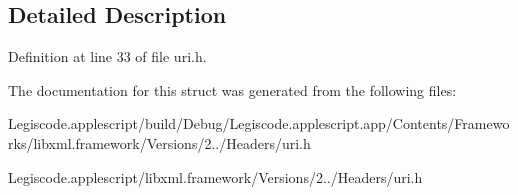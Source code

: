 \subsection{Detailed Description}


Definition at line 33 of file uri.\-h.



The documentation for this struct was generated from the following files\-:\begin{DoxyCompactItemize}
\item 
Legiscode.\-applescript/build/\-Debug/\-Legiscode.\-applescript.\-app/\-Contents/\-Frameworks/libxml.\-framework/\-Versions/2../\-Headers/uri.\-h\item 
Legiscode.\-applescript/libxml.\-framework/\-Versions/2../\-Headers/uri.\-h\end{DoxyCompactItemize}
